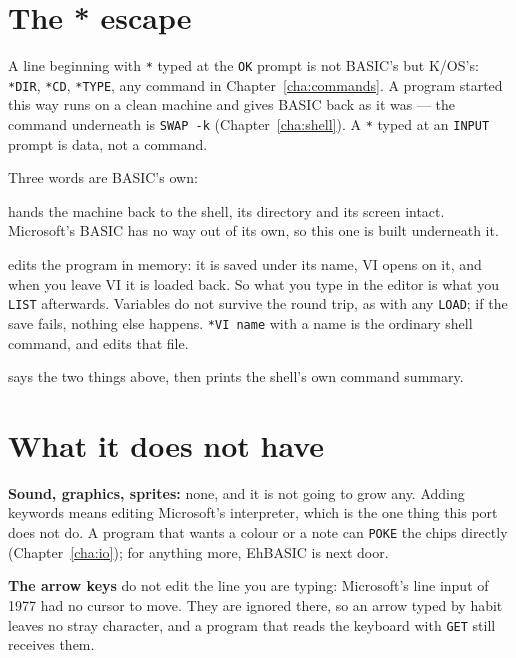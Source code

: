 \section{The * escape}
A line beginning with \verb|*| typed at the \verb|OK| prompt is not
BASIC's but K/OS's: \verb|*DIR|, \verb|*CD|, \verb|*TYPE|, any
command in Chapter~\ref{cha:commands}. A program started this way runs
on a clean machine and gives BASIC back as it was --- the command
underneath is \verb|SWAP -k| (Chapter~\ref{cha:shell}). A \verb|*| typed
at an \verb|INPUT| prompt is data, not a command.

Three words are BASIC's own:

\begin{description}[leftmargin=1.4em,style=nextline]
\item[\texttt{*BYE} (or \texttt{*QUIT})] hands the machine back to the
  shell, its directory and its screen intact. Microsoft's BASIC has no
  way out of its own, so this one is built underneath it.
\item[\texttt{*VI}] edits the program in memory: it is saved under its
  name, VI opens on it, and when you leave VI it is loaded back. So what
  you type in the editor is what you \verb|LIST| afterwards. Variables do
  not survive the round trip, as with any \verb|LOAD|; if the save
  fails, nothing else happens. \verb|*VI name| with a name is the
  ordinary shell command, and edits that file.
\item[\texttt{*HELP}] says the two things above, then prints the shell's
  own command summary.
\end{description}

\section{What it does not have}
\textbf{Sound, graphics, sprites:} none, and it is not going to grow
any. Adding keywords means editing Microsoft's interpreter, which is the
one thing this port does not do. A program that wants a colour or a
note can \verb|POKE| the chips directly (Chapter~\ref{cha:io}); for
anything more, EhBASIC is next door.

\textbf{The arrow keys} do not edit the line you are typing: Microsoft's
line input of 1977 had no cursor to move. They are ignored there, so an
arrow typed by habit leaves no stray character, and a program that reads
the keyboard with \verb|GET| still receives them.
